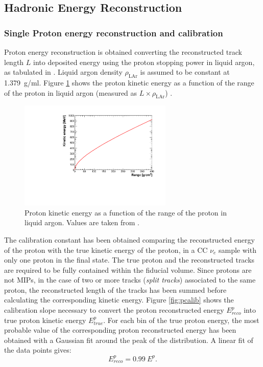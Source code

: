 \subsection{Hadronic Energy Reconstruction}
\subsubsection{Single Proton energy reconstruction and calibration}\label{sec:protonenergy}
Proton energy reconstruction is obtained converting the reconstructed track length $L$ into deposited energy using the proton stopping power in liquid argon, as tabulated in \cite{pstar}. Liquid argon density $\rho_{\mathrm{LAr}}$ is assumed to be constant at 1.379~g/ml. Figure \ref{fig:proton} shows the proton kinetic energy as a function of the range of the proton in liquid argon (measured as $L \times \rho_{\mathrm{LAr}}$) .

\begin{figure}[htbp]
\centering
\includegraphics[width=0.65\textwidth]{figures/proton.pdf}
\caption{Proton kinetic energy as a function of the range of the proton in liquid argon. Values are taken from \cite{pstar}.} 
\label{fig:proton}
\end{figure}

The calibration constant has been obtained comparing the reconstructed energy of the proton with the true kinetic energy of the proton, in a CC $\nu_{e}$ sample with only one proton in the final state. The true proton and the reconstructed tracks are required to be fully contained within the fiducial volume. Since protons are not MIPs, in the case of two or more tracks (\emph{split tracks}) associated to the same proton, the reconstructed length of the tracks has been summed before calculating the corresponding kinetic energy.
Figure \ref{fig:pcalib} shows the calibration slope necessary to convert the proton reconstructed energy $E_{reco}^{p}$ into true proton kinetic energy $E_{true}^{p}$. For each bin of the true proton energy, the most probable value of the corresponding proton reconstructed energy has been obtained with a Gaussian fit around the peak of the distribution. A linear fit of the data points gives:
\begin{equation}
E_{reco}^{p} = 0.99~E^{p}.
\end{equation}

